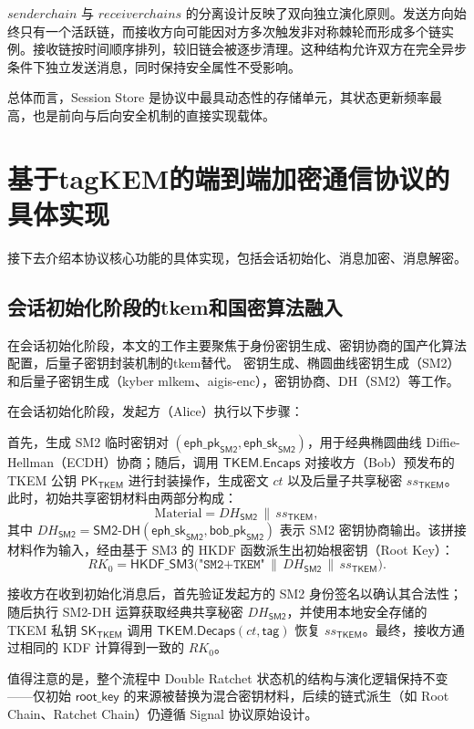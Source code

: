   $senderchain$ 与 $receiverchains$ 的分离设计反映了双向独立演化原则。发送方向始终只有一个活跃链，而接收方向可能因对方多次触发非对称棘轮而形成多个链实例。接收链按时间顺序排列，较旧链会被逐步清理。这种结构允许双方在完全异步条件下独立发送消息，同时保持安全属性不受影响。
   
   总体而言，Session Store 是协议中最具动态性的存储单元，其状态更新频率最高，也是前向与后向安全机制的直接实现载体。


\section{基于tagKEM的端到端加密通信协议的具体实现}

接下去介绍本协议核心功能的具体实现，包括会话初始化、消息加密、消息解密。

\subsection{会话初始化阶段的tkem和国密算法融入}
在会话初始化阶段，本文的工作主要聚焦于身份密钥生成、密钥协商的国产化算法配置，后量子密钥封装机制的tkem替代。
密钥生成、椭圆曲线密钥生成（SM2）和后量子密钥生成（kyber mlkem、aigis-enc），密钥协商、DH（SM2）等工作。

在会话初始化阶段，发起方（Alice）执行以下步骤：

首先，生成 SM2 临时密钥对 $(\mathsf{eph\_pk}_{\mathsf{SM2}}, \mathsf{eph\_sk}_{\mathsf{SM2}})$，用于经典椭圆曲线 Diffie-Hellman（ECDH）协商；随后，调用 $\mathsf{TKEM}.\mathsf{Encaps}$ 对接收方（Bob）预发布的 TKEM 公钥 $\mathsf{PK}_{\mathsf{TKEM}}$ 进行封装操作，生成密文 $ct$ 以及后量子共享秘密 $ss_{\mathsf{TKEM}}$。此时，初始共享密钥材料由两部分构成：
\[
\text{Material} = DH_{\mathsf{SM2}} \,\|\, ss_{\mathsf{TKEM}},
\]
其中 $DH_{\mathsf{SM2}} = \mathsf{SM2\text{-}DH}(\mathsf{eph\_sk}_{\mathsf{SM2}}, \mathsf{bob\_pk}_{\mathsf{SM2}})$ 表示 SM2 密钥协商输出。该拼接材料作为输入，经由基于 SM3 的 HKDF 函数派生出初始根密钥（Root Key）：
\[
RK_0 = \mathsf{HKDF\_SM3}\big( \texttt{"SM2+TKEM"} \,\|\, DH_{\mathsf{SM2}} \,\|\, ss_{\mathsf{TKEM}} \big).
\]

接收方在收到初始化消息后，首先验证发起方的 SM2 身份签名以确认其合法性；随后执行 SM2-DH 运算获取经典共享秘密 $DH_{\mathsf{SM2}}$，并使用本地安全存储的 TKEM 私钥 $\mathsf{SK}_{\mathsf{TKEM}}$ 调用 $\mathsf{TKEM}.\mathsf{Decaps}(ct, \mathsf{tag})$ 恢复 $ss_{\mathsf{TKEM}}$。最终，接收方通过相同的 KDF 计算得到一致的 $RK_0$。

值得注意的是，整个流程中 Double Ratchet 状态机的结构与演化逻辑保持不变——仅初始 $\mathsf{root\_key}$ 的来源被替换为混合密钥材料，后续的链式派生（如 Root Chain、Ratchet Chain）仍遵循 Signal 协议原始设计。


